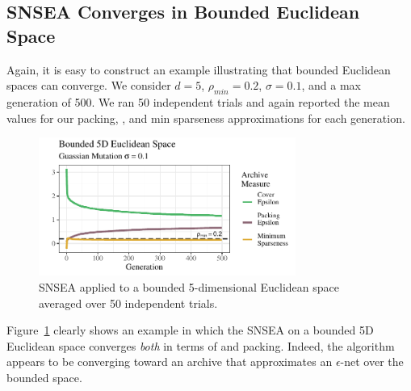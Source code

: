\documentclass[twoside]{article}
\begin{document}
\subsection{SNSEA Converges in Bounded Euclidean Space}
\label{subsec:bounded}
Again, it is easy to construct an example illustrating that bounded Euclidean spaces can converge.  We consider $d=5$, $\rho_{min} = 0.2$, $\sigma=0.1$, and a max generation of 500.  We ran 50 independent trials and again reported the mean values for our packing, , and min sparseness approximations for each generation.  
\begin{figure}[h]
  \center\includegraphics[width=0.75\textwidth]{Figures/bounded-s01-r02-NOPOP.pdf}
  \caption{\label{fig:bounded:nopop:0103} SNSEA applied to a bounded 5-dimensional Euclidean space averaged over 50 independent trials.}
\end{figure}

Figure~\ref{fig:bounded:nopop:0103} clearly shows an example in which the SNSEA on a bounded 5D Euclidean space converges \emph{both} in terms of  and packing.  Indeed, the algorithm appears to be converging toward an archive that approximates an $\epsilon$-net over the bounded space.  
\end{document}
